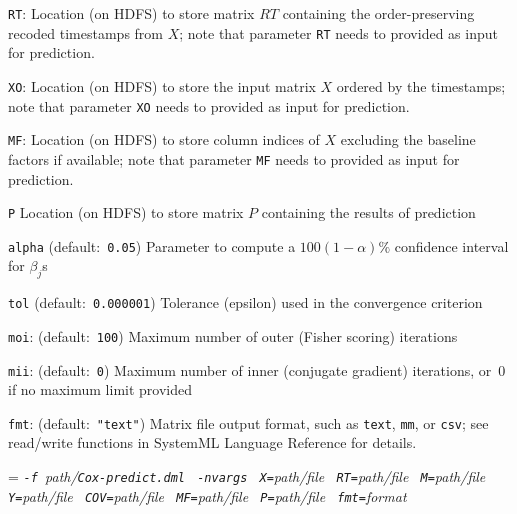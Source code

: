 \begin{Description}
\item[{\tt RT}:]
Location (on HDFS) to store matrix $RT$ containing the order-preserving recoded timestamps from $X$; note that parameter {\tt RT} needs to provided as input for prediction.
\item[{\tt XO}:]
Location (on HDFS) to store the input matrix $X$ ordered by the timestamps; note that parameter {\tt XO} needs to provided as input for prediction.
\item[{\tt MF}:]
Location (on HDFS) to store column indices of $X$ excluding the baseline factors if available; note that parameter {\tt MF} needs to provided as input for prediction.
\item[{\tt P}] 
Location (on HDFS) to store matrix $P$ containing the results of prediction
\item[{\tt alpha}](default:\mbox{ }{\tt 0.05})
Parameter to compute a $100(1-\alpha)\%$ confidence interval for $\beta_j$s 
\item[{\tt tol}](default:\mbox{ }{\tt 0.000001})
Tolerance (epsilon) used in the convergence criterion
\item[{\tt moi}:] (default:\mbox{ }{\tt 100})
Maximum number of outer (Fisher scoring) iterations
\item[{\tt mii}:] (default:\mbox{ }{\tt 0})
Maximum number of inner (conjugate gradient) iterations, or~0 if no maximum
limit provided
\item[{\tt fmt}:] (default:\mbox{ }{\tt "text"})
Matrix file output format, such as {\tt text}, {\tt mm}, or {\tt csv};
see read/write functions in SystemML Language Reference for details.
\end{Description}


 \smallskip
 \smallskip
 
 {\hangindent=\parindent\noindent\it%
 	{\tt{}-f }path/\/{\tt{}Cox-predict.dml}
 	{\tt{} -nvargs}
 	{\tt{} X=}path/file
 	{\tt{} RT=}path/file
 	{\tt{} M=}path/file
 	{\tt{} Y=}path/file
 	{\tt{} COV=}path/file
 	{\tt{} MF=}path/file
 	{\tt{} P=}path/file
 	{\tt{} fmt=}format
 	
 }\smallskip
 
